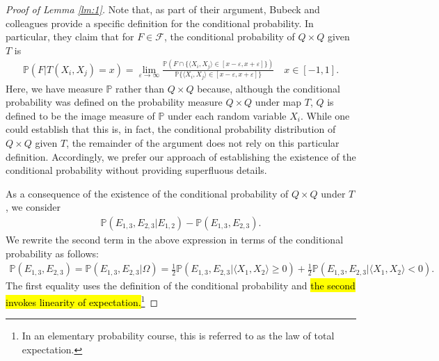 \documentclass{article}
\begin{document}
\begin{proof}[Proof of Lemma \ref{lm:1}]
Note that, as part of their argument, Bubeck and colleagues provide a specific definition for the conditional probability. In particular, they claim that for $F \in \mathcal{F}$, the conditional probability of $Q \times Q$ given $T$  is 
\begin{align*}
    \mathbb{P}(F | T(X_i, X_j) = x) = \lim\limits_{\varepsilon \rightarrow \infty} \frac{\mathbb{P} \left(F \cap \{ \langle X_i, X_j \rangle \in [x - \varepsilon, x + \varepsilon] \} \right)}{\mathbb{P}\{ \langle X_i, X_j \rangle \in [x - \varepsilon, x + \varepsilon] \}} \quad x \in [-1, 1].
\end{align*}
Here, we have measure $\mathbb{P}$ rather than $Q \times Q$ because, although the conditional probability was defined on the probability measure $Q \times Q$ under map $T$, $Q$ is defined to be the image measure of $\mathbb{P}$ under each random variable $X_i$. While one could establish that this is, in fact, the conditional probability distribution of $Q \times Q$ given $T$, the remainder of the argument does not rely on this particular definition. Accordingly, we prefer our approach of establishing the existence of the conditional probability without providing superfluous details.

As a consequence of the existence of the conditional probability of $Q \times Q$ under $T$, we consider
\begin{align*}
    \mathbb{P}(E_{1,3}, E_{2,3} | E_{1,2}) - \mathbb{P}(E_{1,3},E_{2,3}). 
\end{align*}
We rewrite the second term in the above expression in terms of the conditional probability as follows:
\begin{align*}
    \mathbb{P}(E_{1, 3}, E_{2,3}) = \mathbb{P}(E_{1, 3}, E_{2,3}| \Omega) = \frac{1}{2}\mathbb{P}(E_{1, 3}, E_{2,3}| \langle X_1, X_2 \rangle \geq 0) + \frac{1}{2}\mathbb{P}(E_{1, 3}, E_{2,3}| \langle X_1, X_2 \rangle < 0). 
\end{align*}
The first equality uses the definition of the conditional probability and \hl{the second invokes linearity of expectation.}\footnote{In an elementary probability course, this is referred to as the law of total expectation.}


\end{proof}
\end{document}
